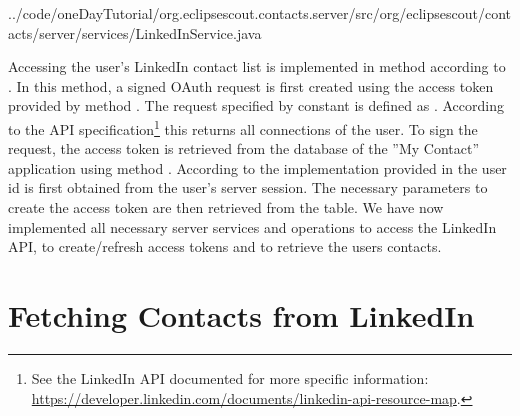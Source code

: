 \documentclass[a4paper,10pt,twoside]{book}
\begin{document}

{../code/oneDayTutorial/org.eclipsescout.contacts.server/src/org/eclipsescout/contacts/server/services/LinkedInService.java}

Accessing the user's LinkedIn contact list is implemented in method  according to .
In this method, a signed OAuth request is first created using the access token provided by method . 
The request specified by constant  is defined as . 
According to the API specification\footnote{
See the LinkedIn API documented for more specific information: \url{https://developer.linkedin.com/documents/linkedin-api-resource-map}.
} 
this returns all connections of the user.
To sign the request, the access token is retrieved from the database of the ''My Contact'' application using method . 
According to the implementation provided in  the user id is first obtained from the user's server session. 
The necessary parameters to create the access token are then retrieved from the  table. 
We have now implemented all necessary server services and operations to access the LinkedIn API, to create/refresh access tokens and to retrieve the users contacts. 

\section{Fetching Contacts from LinkedIn}
\end{document}
